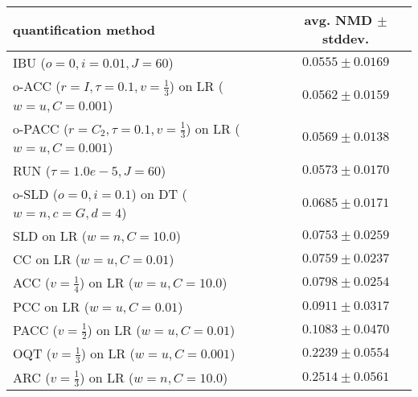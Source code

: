 \begin{tabular}{lc}
  \toprule
  quantification method & avg. NMD $\pm$ stddev. \\
  \midrule
  IBU ($o=0, i=0.01, J=60$) & $\mathbf{0.0555 \pm 0.0169}$ \\
  o-ACC ($r=I, \tau=0.1, v=\frac{1}{3}$) on LR ($w=u, C=0.001$) & $\mathbf{0.0562 \pm 0.0159}$ \\
  o-PACC ($r=C_2, \tau=0.1, v=\frac{1}{3}$) on LR ($w=u, C=0.001$) & $\mathbf{0.0569 \pm 0.0138}$ \\
  RUN ($\tau=1.0e-5, J=60$) & $0.0573 \pm 0.0170$ \\
  o-SLD ($o=0, i=0.1$) on DT ($w=n, c=G, d=4$) & $0.0685 \pm 0.0171$ \\
  SLD on LR ($w=n, C=10.0$) & $0.0753 \pm 0.0259$ \\
  CC on LR ($w=u, C=0.01$) & $0.0759 \pm 0.0237$ \\
  ACC ($v=\frac{1}{4}$) on LR ($w=u, C=10.0$) & $0.0798 \pm 0.0254$ \\
  PCC on LR ($w=u, C=0.01$) & $0.0911 \pm 0.0317$ \\
  PACC ($v=\frac{1}{2}$) on LR ($w=u, C=0.01$) & $0.1083 \pm 0.0470$ \\
  OQT ($v=\frac{1}{3}$) on LR ($w=u, C=0.001$) & $0.2239 \pm 0.0554$ \\
  ARC ($v=\frac{1}{3}$) on LR ($w=n, C=10.0$) & $0.2514 \pm 0.0561$ \\
  \bottomrule
\end{tabular}

